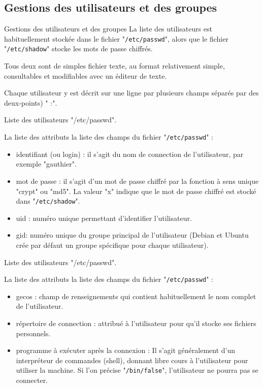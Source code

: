 \documentclass[10pt]{beamer}
\begin{document}
\subsection{Gestions des utilisateurs et des groupes}
\begin{frame}{Gestions des utilisateurs et des groupes}
La liste des utilisateurs est habituellement stockée dans le fichier "\texttt{/etc/passwd}",
alors que le fichier "\texttt{/etc/shadow}" stocke les mots de passe chiffrés. 

Tous deux sont de simples fichier texte, au format relativement simple, consultables et modifiables avec un éditeur de texte.

 Chaque utilisateur y est décrit sur une ligne par plusieurs champs séparés par des deux-points) " :".
\end{frame}

\begin{frame}{Liste des utilisateurs "/etc/passwd".}
\begin{alertblock}{La liste des attributs}
la liste des champs du fichier "\texttt{/etc/passwd}" :
\begin{itemize}
\item \alert{identifiant (ou login)} : il s'agit du nom de connection de l'utilisateur, par exemple "gauthier".
\item \alert{mot de passe} : il s'agit d'un mot de passe chiffré par la fonction à sens unique "\alert{crypt}" ou "\alert{md5}". La valeur "\alert{x}" indique que le mot de passe chiffré est stocké dans "\texttt{/etc/shadow}".
\item \alert{uid} : numéro unique permettant d'identifier l'utilisateur.
\item \alert{gid}: numéro unique du groupe principal de l'utilisateur (Debian et Ubuntu crée par défaut un groupe spécifique pour chaque utilisateur).
\end{itemize}
\end{alertblock}
\end{frame}

\begin{frame}{Liste des utilisateurs "/etc/passwd".}
\begin{alertblock}{La liste des attributs}
la liste des champs du fichier "\texttt{/etc/passwd}" :
\begin{itemize}
\item \alert{gecos} : champ de renseignements qui contient habituellement le nom complet de l'utilisateur.
\item \alert{répertoire de connection} : attribué à l'utilisateur pour qu'il stocke ses fichiers personnels.
\item \alert{programme à exécuter après la connexion} : Il s'agit généralement d'un interpréteur de commandes (shell), donnant libre cours à l'utilisateur pour utiliser la machine. Si l'on précise "\texttt{/bin/false}", l'utilisateur ne pourra pas se connecter.
\end{itemize}
\end{alertblock}
\end{frame}
\end{document}
